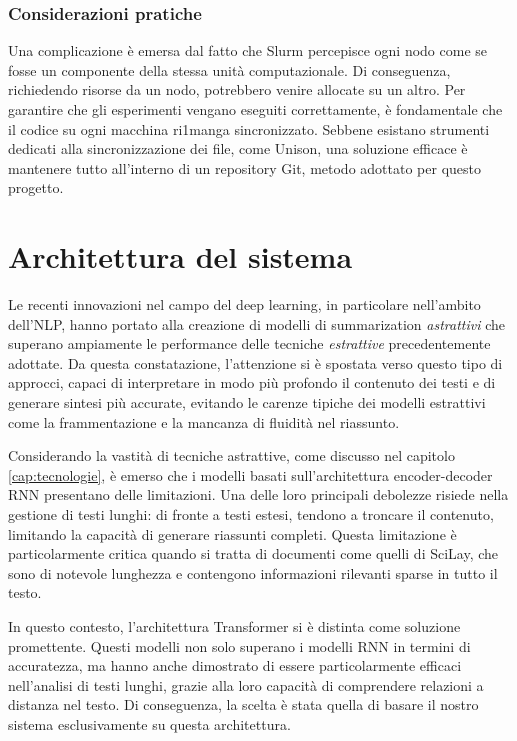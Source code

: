 \documentclass[12pt,a4paper,twoside,openright]{book}
\begin{document}
\subsubsection{Considerazioni pratiche}
Una complicazione è emersa dal fatto che Slurm percepisce ogni nodo come se fosse un componente della stessa unità computazionale. Di conseguenza, richiedendo risorse da un nodo, potrebbero venire allocate su un altro. Per garantire che gli esperimenti vengano eseguiti correttamente, è fondamentale che il codice su ogni macchina ri1manga sincronizzato. Sebbene esistano strumenti dedicati alla sincronizzazione dei file, come Unison, una soluzione efficace è mantenere tutto all'interno di un repository Git, metodo adottato per questo progetto.


\section{Architettura del sistema}
Le recenti innovazioni nel campo del deep learning, in particolare nell'ambito dell'NLP, hanno portato alla creazione di modelli di summarization \emph{astrattivi} che superano ampiamente le performance delle tecniche \emph{estrattive} precedentemente adottate. Da questa constatazione, l'attenzione si è spostata verso questo tipo di approcci, capaci di interpretare in modo più profondo il contenuto dei testi e di generare sintesi più accurate, evitando le carenze tipiche dei modelli estrattivi come la frammentazione e la mancanza di fluidità nel riassunto.

Considerando la vastità di tecniche astrattive, come discusso nel capitolo \ref{cap:tecnologie}, è emerso che i modelli basati sull'architettura encoder-decoder RNN presentano delle limitazioni. Una delle loro principali debolezze risiede nella gestione di testi lunghi: di fronte a testi estesi, tendono a troncare il contenuto, limitando la capacità di generare riassunti completi. Questa limitazione è particolarmente critica quando si tratta di documenti come quelli di SciLay, che sono di notevole lunghezza e contengono informazioni rilevanti sparse in tutto il testo.

In questo contesto, l'architettura Transformer si è distinta come soluzione promettente. Questi modelli non solo superano i modelli RNN in termini di accuratezza, ma hanno anche dimostrato di essere particolarmente efficaci nell'analisi di testi lunghi, grazie alla loro capacità di comprendere relazioni a distanza nel testo. Di conseguenza, la scelta è stata quella di basare il nostro sistema esclusivamente su questa architettura.
\end{document}
